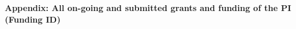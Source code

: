


\newpage
\centerline{\textbf{Appendix: All on-going and submitted grants and funding of
    the PI (Funding ID)}}
